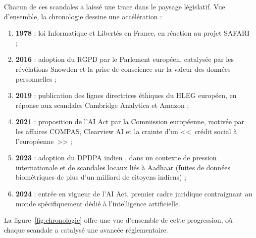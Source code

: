 \documentclass[12pt,a4paper]{article}
\begin{document}
Chacun de ces scandales a laissé une trace dans le paysage législatif. Vue d'ensemble, la chronologie dessine une accélération :
\begin{enumerate}
    \item \textbf{1978} : loi Informatique et Libertés en France, en réaction au projet SAFARI ;
    \item \textbf{2016} : adoption du RGPD par le Parlement européen, catalysée par les révélations Snowden et la prise de conscience sur la valeur des données personnelles ;
    \item \textbf{2019} : publication des lignes directrices éthiques du HLEG européen, en réponse aux scandales Cambridge Analytica et Amazon ;
    \item \textbf{2021} : proposition de l'AI Act par la Commission européenne, motivée par les affaires COMPAS, Clearview AI et la crainte d'un <<~crédit social à l'européenne~>> ;
    \item \textbf{2023} : adoption du DPDPA indien \cite{dpdpa_india}, dans un contexte de pression internationale et de scandales locaux liés à Aadhaar (fuites de données biométriques de plus d'un milliard de citoyens indiens) ;
    \item \textbf{2024} : entrée en vigueur de l'AI Act, premier cadre juridique contraignant au monde spécifiquement dédié à l'intelligence artificielle.
\end{enumerate}

\noindent La figure~\ref{fig:chronologie} offre une vue d'ensemble de cette progression, où chaque scandale a catalysé une avancée réglementaire.
\end{document}
